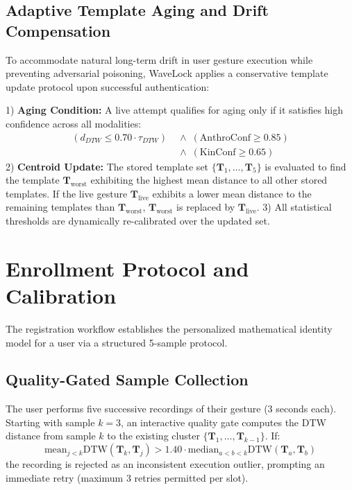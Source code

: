 \documentclass[conference]{IEEEtran}
\begin{document}
\subsection{Adaptive Template Aging and Drift Compensation}

To accommodate natural long-term drift in user gesture execution while preventing adversarial poisoning, WaveLock applies a conservative template update protocol upon successful authentication:

1) \textbf{Aging Condition:} A live attempt qualifies for aging only if it satisfies high confidence across all modalities:
\begin{equation}
\begin{split}
(d_{DTW} \le 0.70 \cdot \tau_{DTW}) &\;\wedge\; (\text{AnthroConf} \ge 0.85) \\
&\;\wedge\; (\text{KinConf} \ge 0.65)
\end{split}
\end{equation}
2) \textbf{Centroid Update:} The stored template set $\{\mathbf{T}_1, \ldots, \mathbf{T}_5\}$ is evaluated to find the template $\mathbf{T}_{\text{worst}}$ exhibiting the highest mean distance to all other stored templates. If the live gesture $\mathbf{T}_{\text{live}}$ exhibits a lower mean distance to the remaining templates than $\mathbf{T}_{\text{worst}}$, $\mathbf{T}_{\text{worst}}$ is replaced by $\mathbf{T}_{\text{live}}$.
3) All statistical thresholds are dynamically re-calibrated over the updated set.

\section{Enrollment Protocol and Calibration}
\label{sec:enrollment}

The registration workflow establishes the personalized mathematical identity model for a user via a structured 5-sample protocol.

\subsection{Quality-Gated Sample Collection}
The user performs five successive recordings of their gesture (3 seconds each). Starting with sample $k = 3$, an interactive quality gate computes the DTW distance from sample $k$ to the existing cluster $\{\mathbf{T}_1, \ldots, \mathbf{T}_{k-1}\}$. If:
\begin{equation}
\text{mean}_{j < k} \text{DTW}(\mathbf{T}_k, \mathbf{T}_j) > 1.40 \cdot \text{median}_{a < b < k} \text{DTW}(\mathbf{T}_a, \mathbf{T}_b)
\end{equation}
the recording is rejected as an inconsistent execution outlier, prompting an immediate retry (maximum 3 retries permitted per slot).
\end{document}
